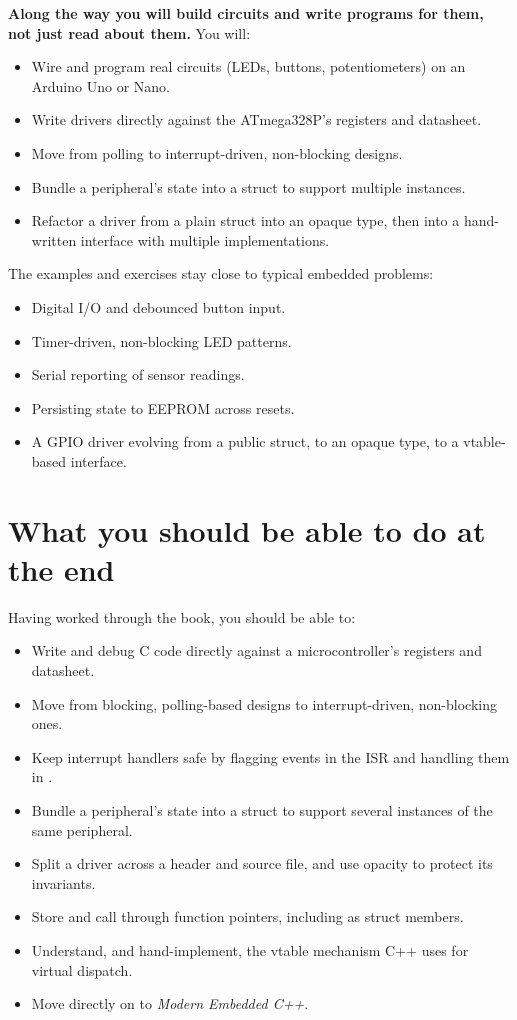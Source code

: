 \textbf{Along the way you will build circuits and write programs for them, not just read about
them.} You will:
\begin{itemize}
  \item Wire and program real circuits (LEDs, buttons, potentiometers) on an Arduino Uno or Nano.
  \item Write drivers directly against the ATmega328P's registers and datasheet.
  \item Move from polling to interrupt-driven, non-blocking designs.
  \item Bundle a peripheral's state into a struct to support multiple instances.
  \item Refactor a driver from a plain struct into an opaque type, then into a hand-written
    interface with multiple implementations.
\end{itemize}
The examples and exercises stay close to typical embedded problems:
\begin{itemize}
  \item Digital I/O and debounced button input.
  \item Timer-driven, non-blocking LED patterns.
  \item Serial reporting of sensor readings.
  \item Persisting state to EEPROM across resets.
  \item A GPIO driver evolving from a public struct, to an opaque type, to a vtable-based
    interface.
\end{itemize}

\section*{What you should be able to do at the end}
Having worked through the book, you should be able to:
\begin{itemize}
  \item Write and debug C code directly against a microcontroller's registers and datasheet.
  \item Move from blocking, polling-based designs to interrupt-driven, non-blocking ones.
  \item Keep interrupt handlers safe by flagging events in the ISR and handling them in
    .
  \item Bundle a peripheral's state into a struct to support several instances of the same
    peripheral.
  \item Split a driver across a header and source file, and use opacity to protect its invariants.
  \item Store and call through function pointers, including as struct members.
  \item Understand, and hand-implement, the vtable mechanism C++ uses for virtual dispatch.
  \item Move directly on to \emph{Modern Embedded C++}.
\end{itemize}

